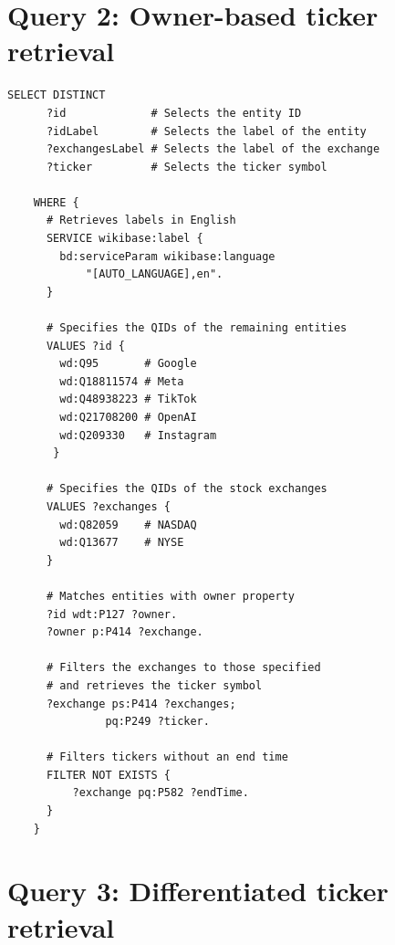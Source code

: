\section{Query 2: Owner-based ticker retrieval}
\label{appsec:q2-owner-based-ticker-retrieval}

\begin{lstlisting}[language=SPARQL, caption={SPARQL Query 2: Retrieve entity information for remaining entities with the \textit{owned by} property.}, label={lst:sparql_query_2}]
    SELECT DISTINCT 
      ?id             # Selects the entity ID
      ?idLabel        # Selects the label of the entity
      ?exchangesLabel # Selects the label of the exchange
      ?ticker         # Selects the ticker symbol
      
    WHERE {
      # Retrieves labels in English
      SERVICE wikibase:label {
        bd:serviceParam wikibase:language 
            "[AUTO_LANGUAGE],en".
      }
    
      # Specifies the QIDs of the remaining entities
      VALUES ?id { 
        wd:Q95       # Google
        wd:Q18811574 # Meta
        wd:Q48938223 # TikTok
        wd:Q21708200 # OpenAI
        wd:Q209330   # Instagram        
       }
    
      # Specifies the QIDs of the stock exchanges
      VALUES ?exchanges { 
        wd:Q82059    # NASDAQ
        wd:Q13677    # NYSE
      }
    
      # Matches entities with owner property
      ?id wdt:P127 ?owner.
      ?owner p:P414 ?exchange.
    
      # Filters the exchanges to those specified 
      # and retrieves the ticker symbol
      ?exchange ps:P414 ?exchanges; 
               pq:P249 ?ticker.

      # Filters tickers without an end time
      FILTER NOT EXISTS {
          ?exchange pq:P582 ?endTime.
      }
    }
\end{lstlisting}

\section{Query 3: Differentiated ticker retrieval}
\label{appsec:q3-differentiated-ticker-retrieval}


